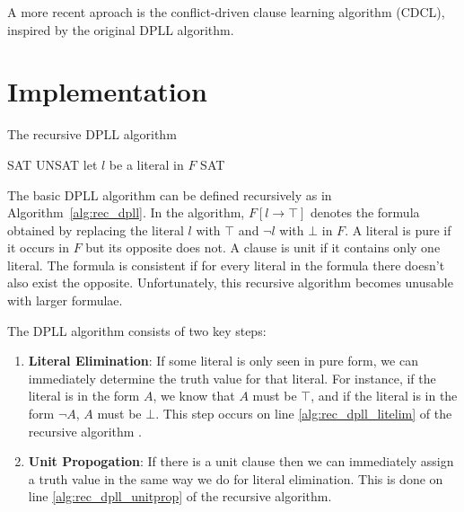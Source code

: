 \documentclass[10pt,AMS Euler]{article}
\begin{document}
A more recent aproach is the conflict-driven clause learning algorithm (CDCL), inspired by the original DPLL
algorithm. 

\section*{Implementation}
\label{sec:org8f47c44}
\begin{algorithm}
\caption{The recursive DPLL algorithm}
\label{alg:rec_dpll}
\begin{algorithmic}[1]
  \State \Return SAT
  \State \Return UNSAT
 \label{alg:rec_dpll_litelim}
  \State \Return {}
 \label{alg:rec_dpll_unitprop}
  \State \Return {}
\Else
  \State let $l$ be a literal in $F$
    \State \Return SAT
  \Else
    \State \Return {}
  \EndIf
\EndIf
\EndFunction
\end{algorithmic}
\end{algorithm}

The basic DPLL algorithm can be defined recursively as in Algorithm~\ref{alg:rec_dpll}.
In the algorithm, \(F[l \to \top]\) denotes the formula obtained by replacing the literal \(l\) with \(\top\) and
\(\neg l\) with \(\bot\) in \(F\). A literal is pure if it occurs in \(F\) but its opposite does not. A clause is unit
if it contains only one literal. The formula is consistent if for every literal in the formula there doesn't
also exist the opposite. Unfortunately, this recursive algorithm becomes unusable with larger formulae.

The DPLL algorithm consists of two key steps:
\begin{enumerate}
\item \textbf{Literal Elimination}: If some literal is only seen in pure form, we can immediately determine the
truth value for that literal. For instance, if the literal is in the form \(A\), we know that \(A\) must be
\(\top\), and if the literal is in the form \(\neg A\), \(A\) must be \(\bot\). This step occurs on line
\ref{alg:rec_dpll_litelim} of the recursive algorithm .
\item \textbf{Unit Propogation}: If there is a unit clause then we can immediately assign a truth value in the same
way we do for literal elimination. This is done on line \ref{alg:rec_dpll_unitprop} of the recursive
algorithm.
\end{enumerate}
\end{document}
